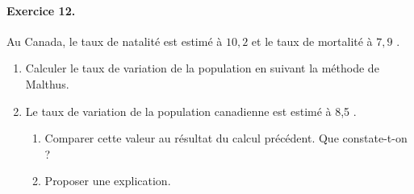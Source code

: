 \documentclass[11pt]{article}
\begin{document}
\paragraph{Exercice 12.}

Au Canada, le taux de natalité est estimé à $10,2$ \textperthousand \hspace{0.2em} et le taux de mortalité à $7,9$ \textperthousand.
\begin{enumerate}
	\item Calculer le taux de variation de la population en suivant la méthode de Malthus.
	\item Le taux de variation de la population canadienne est estimé à 8,5 \textperthousand.
	\begin{enumerate}[leftmargin=*,label=\alph*)]
		\item Comparer cette valeur au résultat du calcul précédent. Que constate-t-on ?
		\item Proposer une explication.
	\end{enumerate}
\end{enumerate}
\end{document}
